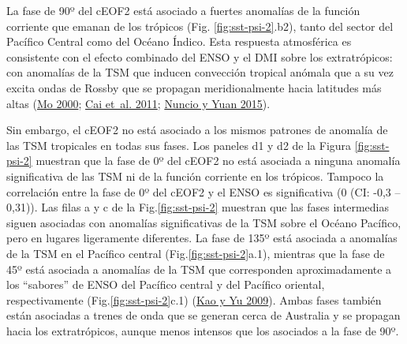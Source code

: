 \documentclass[12pt,oneside,a4paper]{reedthesis}
\begin{document}
La fase de 90º del cEOF2 está asociado a fuertes anomalías de la función corriente que emanan de los trópicos (Fig. \ref{fig:sst-psi-2}.b2), tanto del sector del Pacífico Central como del Océano Índico.
Esta respuesta atmosférica es consistente con el efecto combinado del ENSO y el DMI sobre los extratrópicos: con anomalías de la TSM que inducen convección tropical anómala que a su vez excita ondas de Rossby que se propagan meridionalmente hacia latitudes más altas (\protect\hyperlink{ref-mo2000}{Mo 2000}; \protect\hyperlink{ref-cai2011}{Cai et~al. 2011}; \protect\hyperlink{ref-nuncio2015}{Nuncio y Yuan 2015}).

Sin embargo, el cEOF2 no está asociado a los mismos patrones de anomalía de las TSM tropicales en todas sus fases.
Los paneles d1 y d2 de la Figura \ref{fig:sst-psi-2} muestran que la fase de 0º del cEOF2 no está asociada a ninguna anomalía significativa de las TSM ni de la función corriente en los trópicos.
Tampoco la correlación entre la fase de 0º del cEOF2 y el ENSO es significativa (0 (CI: -0,3 -- 0,31)).
Las filas a y c de la Fig.\ref{fig:sst-psi-2} muestran que las fases intermedias siguen asociadas con anomalías significativas de la TSM sobre el Océano Pacífico, pero en lugares ligeramente diferentes.
La fase de 135º está asociada a anomalías de la TSM en el Pacífico central (Fig.\ref{fig:sst-psi-2}a.1), mientras que la fase de 45º está asociada a anomalías de la TSM que corresponden aproximadamente a los ``sabores'' de ENSO del Pacífico central y del Pacífico oriental, respectivamente (Fig.\ref{fig:sst-psi-2}c.1) (\protect\hyperlink{ref-kao2009}{Kao y Yu 2009}).
Ambas fases también están asociadas a trenes de onda que se generan cerca de Australia y se propagan hacia los extratrópicos, aunque menos intensos que los asociados a la fase de 90º.
\end{document}

